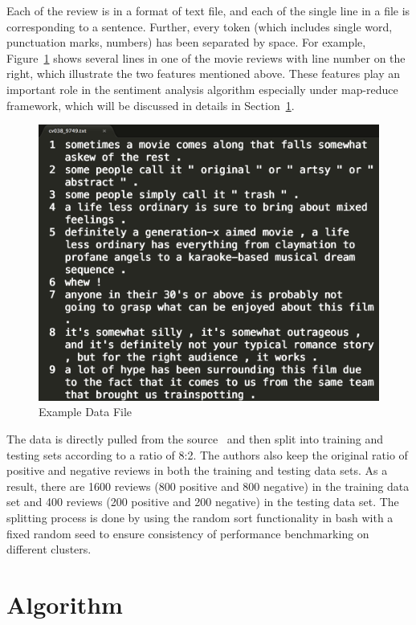 Each of the review is in a format of text file, and each of the single line in a 
file is corresponding to a sentence. Further, every token (which includes 
single word, punctuation marks, numbers) has been separated by space. For 
example, Figure~\ref{f:data} shows several lines in one of the movie reviews 
with line number on the right, which illustrate the two features mentioned 
above. These features play an important role in the sentiment analysis 
algorithm especially under map-reduce framework, which will be discussed in 
details in Section~\ref{s:algorithm}.
\begin{figure}[!ht]
	\centering\includegraphics[width=\columnwidth]{images/polarity-data.png}
	\caption{Example Data File}
	\label{f:data}
\end{figure}

The data is directly pulled from the 
source~\cite{hid-sp18-405-sentiment-data} and then split into training and 
testing sets according to a ratio of 8:2. The authors also keep the original 
ratio of positive and negative reviews in both the training and testing data 
sets. As a result, there are 1600 reviews (800 positive and 800 negative) in 
the training data set and 400 reviews (200 positive and 200 negative) in the 
testing data set. The splitting process is done by using the random sort 
functionality in bash with a fixed random seed to ensure consistency of 
performance benchmarking on different clusters. 


\section{Algorithm}
\label{s:algorithm}

